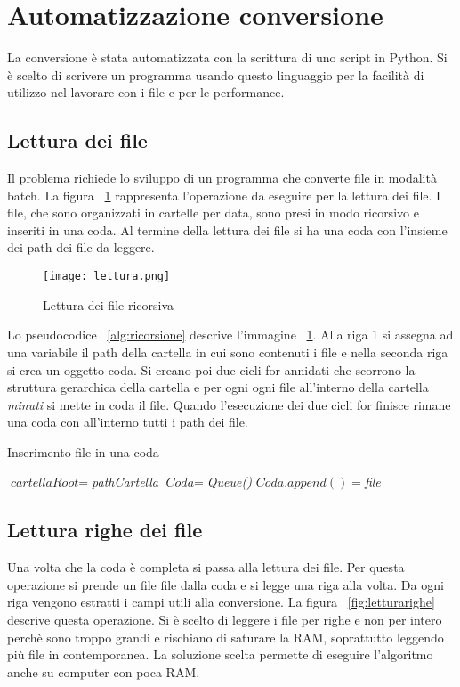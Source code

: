 \documentclass[../main.tex]{subfiles}
\begin{document}
\section{Automatizzazione conversione}
La conversione è stata automatizzata con la scrittura di uno script in Python. Si è scelto di scrivere un programma usando questo linguaggio per la facilità di utilizzo nel lavorare con i file e per le performance.

\subsection{Lettura dei file}\label{letturafilesec}
Il problema richiede lo sviluppo di un programma che converte file in modalità batch.
La figura ~\ref{fig:lettura} rappresenta l'operazione da eseguire per la lettura dei file. I file, che sono organizzati in cartelle per data, sono presi in modo ricorsivo e inseriti in una coda. Al termine della lettura dei file si ha una coda con l'insieme dei path dei file da leggere.
\begin{figure}[H]
				\centering
\texttt{[image: lettura.png]}
				\caption{Lettura dei file ricorsiva}
				\label{fig:lettura}
\end{figure}

Lo pseudocodice ~\ref{alg:ricorsione} descrive l'immagine ~\ref{fig:lettura}. Alla riga 1 si assegna ad una variabile il path della cartella in cui sono contenuti i file e nella seconda riga si crea un oggetto coda. Si creano poi due cicli for annidati che scorrono la struttura gerarchica della cartella e per ogni ogni file all'interno della cartella \textit{minuti} si mette in coda il file. Quando l'esecuzione dei due cicli for finisce rimane una coda con all'interno tutti i path dei file.
\begin{algorithm}
\caption{Inserimento file in una coda}
				\label{alg:ricorsione}
\begin{algorithmic}[1]
				\State $\textit{cartellaRoot} =  $\textit{pathCartella}
				\State $\textit{Coda} = $\textit{Queue()}
						\State $\textit{Coda}.append() = $\textit{file}
						\EndFor
				\EndFor
\end{algorithmic}
\end{algorithm}

\subsection{Lettura righe dei file} 
Una volta che la coda è completa si passa alla lettura dei file. Per questa operazione si prende un file file dalla coda e si legge una riga alla volta. Da ogni riga vengono estratti i campi utili alla conversione.
La figura ~\ref{fig:letturarighe} descrive questa operazione. Si è scelto di leggere i file per righe e non per intero perchè sono troppo grandi e rischiano di saturare la RAM, soprattutto leggendo più file in contemporanea. La soluzione scelta permette di eseguire l'algoritmo anche su computer con poca RAM.
\end{document}
